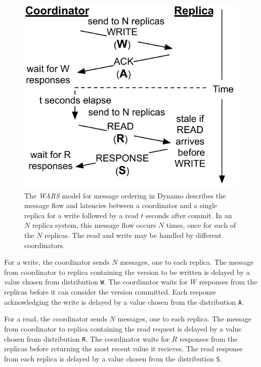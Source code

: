 \documentclass{vldb}
\begin{document}
\begin{figure}
\centering
\includegraphics[width=.8\columnwidth]{figs/dynamostale.pdf}
\vspace{-8pt}
\caption{The \textit{WARS} model for message ordering in Dynamo
  describes the message flow and latencies between a coordinator and a
  single replica for a write followed by a read $t$ seconds after
  commit.  In an $N$ replica system, this message flow occurs $N$
  times, once for each of the $N$ replicas.  The read and write may be
  handled by different coordinators.}
\vspace{-12pt}
\label{fig:dynamo-diagram}
\end{figure}

For a write, the coordinator sends $N$ messages, one to each
replica. The message from coordinator to replica containing the
version to be written is delayed by a value chosen from distribution
\texttt{W}.  The coordinator waits for $W$ responses from the replicas
before it can consider the version committed.  Each response
acknowledging the write is delayed by a value chosen from the
distribution \texttt{A}.

For a read, the coordinator sends $N$ messages, one to each replica.
The message from coordinator to replica containing the read request is
delayed by a value chosen from distribution \texttt{R}.  The
coordinator waits for $R$ responses from the replicas before returning
the most recent value it recieves.  The read response from each
replica is delayed by a value chosen from the distribution \texttt{S}.
\end{document}
